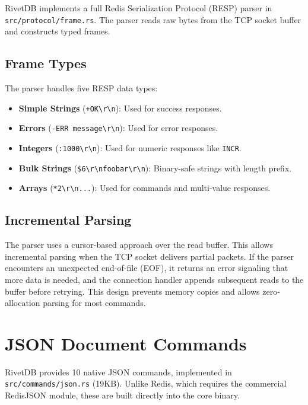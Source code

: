 RivetDB implements a full Redis Serialization Protocol (RESP) parser in \texttt{src/protocol/frame.rs}. The parser reads raw bytes from the TCP socket buffer and constructs typed frames.

\subsection{Frame Types}
The parser handles five RESP data types:
\begin{itemize}[leftmargin=2.5em]
    \item \textbf{Simple Strings} (\texttt{+OK\textbackslash r\textbackslash n}): Used for success responses.
    \item \textbf{Errors} (\texttt{-ERR message\textbackslash r\textbackslash n}): Used for error responses.
    \item \textbf{Integers} (\texttt{:1000\textbackslash r\textbackslash n}): Used for numeric responses like \texttt{INCR}.
    \item \textbf{Bulk Strings} (\texttt{\$6\textbackslash r\textbackslash nfoobar\textbackslash r\textbackslash n}): Binary-safe strings with length prefix.
    \item \textbf{Arrays} (\texttt{*2\textbackslash r\textbackslash n...}): Used for commands and multi-value responses.
\end{itemize}

\subsection{Incremental Parsing}
The parser uses a cursor-based approach over the read buffer. This allows incremental parsing when the TCP socket delivers partial packets. If the parser encounters an unexpected end-of-file (EOF), it returns an error signaling that more data is needed, and the connection handler appends subsequent reads to the buffer before retrying. This design prevents memory copies and allows zero-allocation parsing for most commands.

\section{JSON Document Commands}

RivetDB provides 10 native JSON commands, implemented in \texttt{src/commands/json.rs} (19KB). Unlike Redis, which requires the commercial RedisJSON module, these are built directly into the core binary.

